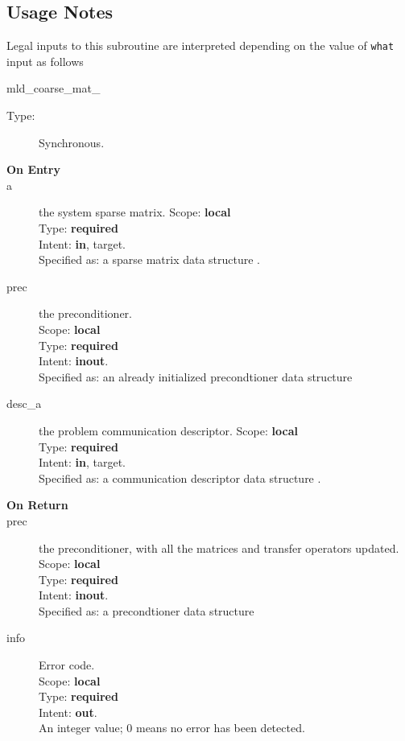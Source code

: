 \subsection*{Usage Notes}
Legal inputs to this subroutine are interpreted depending on the value
of \verb|what| input as follows
\begin{description}
\item[mld\_coarse\_mat\_] 
\end{description}



\begin{description}
\item[Type:] Synchronous.
\item[\bf On Entry]
\item[a] the system sparse matrix.
Scope: {\bf local} \\
Type: {\bf required}\\
Intent: {\bf in}, target.\\
Specified as: a sparse matrix data structure \spdata.
\item[prec] the preconditioner.\\
Scope: {\bf local} \\
Type: {\bf required}\\
Intent: {\bf inout}.\\
Specified as: an already initialized precondtioner data structure \precdata\\
\item[desc\_a] the problem communication descriptor. 
Scope: {\bf local} \\
Type: {\bf required}\\
Intent: {\bf in}, target.\\
Specified as: a communication descriptor data structure \descdata.
\end{description}

\begin{description}
\item[\bf On Return]
\item[prec] the preconditioner, with all the matrices and transfer
  operators updated.\\
Scope: {\bf local} \\
Type: {\bf required}\\
Intent: {\bf inout}.\\
Specified as: a precondtioner data structure \precdata\\
\item[info] Error code.\\
Scope: {\bf local} \\
Type: {\bf required} \\
Intent: {\bf out}.\\
An integer value; 0 means no error has been detected. 
\end{description}


